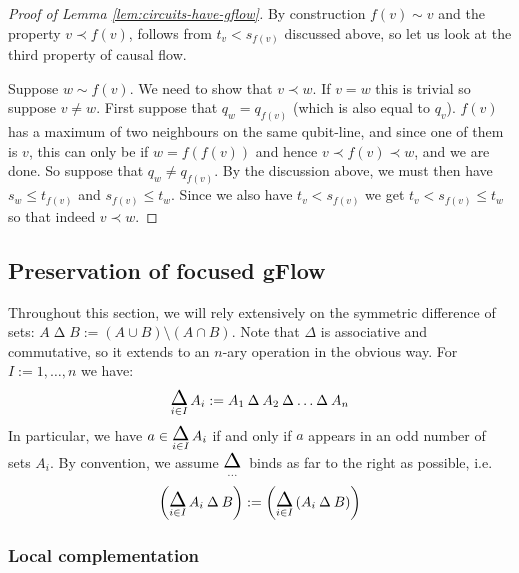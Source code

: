 \documentclass[a4paper,onecolumn,superscriptaddress,11pt,accepted=2020-04-27]{quantumarticle}
\newcommand{\symd}{\mathbin{\Delta}\xspace}
\newcommand{\Symdi}[1]{\underset{\scriptstyle #1}{\scalebox{1.5}{$\symd$}}\,}
\theoremstyle{definition}
\begin{document}
\begin{proof}[Proof of Lemma \ref{lem:circuits-have-gflow}]
  By construction $f(v)\sim v$ and the property $v \prec f(v)$, follows from $t_v < s_{f(v)}$ discussed above,
  so let us look at the third property of causal flow.

  Suppose $w\sim f(v)$. We need to show that $v\prec w$. If $v=w$ this is trivial so suppose $v\neq w$.
  First suppose that $q_w = q_{f(v)}$ (which is also equal to $q_v$). $f(v)$ has a maximum of two neighbours
  on the same qubit-line, and since one of them is $v$, this can only be if $w=f(f(v))$ and hence $v\prec f(v)\prec w$,
  and we are done.
  So suppose that $q_w\neq q_{f(v)}$. 
  By the discussion above, we must then have $s_w\leq t_{f(v)}$ and $s_{f(v)} \leq t_w$.
  Since we also have $t_v < s_{f(v)}$ we get $t_v < s_{f(v)} \leq t_w$ so that indeed $v\prec w$.
\end{proof}



\subsection{Preservation of focused gFlow}
\label{sec:pres-focus-gflow}

Throughout this section, we will rely extensively on the symmetric difference of sets: ${A\symd B} := (A\cup B)\setminus (A\cap B)$. Note that $\symd$ is associative and commutative, so it extends to an $n$-ary operation in the obvious way. For $I:={1,\ldots,n}$ we have:
\[\Symdi{i \in I} A_i := A_1 \symd A_2 \symd \ldots \symd A_n \]
In particular, we have $a \in \Symdi{i \in I} A_i$ if and only if $a$ appears in an odd number of sets $A_i$. By convention, we assume $\Symdi{...}$ binds as far to the right as possible, i.e.
\[ \left( \Symdi{i \in I} A_i \symd B \right) := \left( \Symdi{i \in I} (A_i \symd B) \right) \]

\subsubsection{Local complementation}
\label{sec:proofLC}
\end{document}

